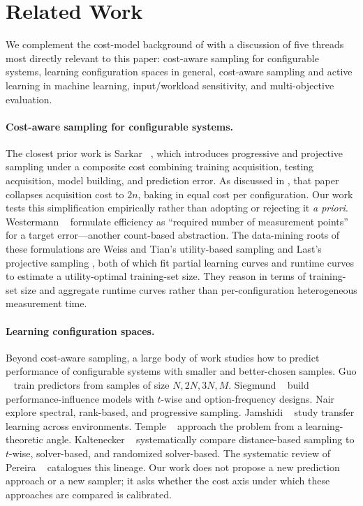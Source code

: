 \section{Related Work}
\label{sec:related_work}

We complement the cost-model background of  with a
discussion of five threads most directly relevant to this paper:
cost-aware sampling for configurable systems, learning configuration spaces
in general, cost-aware sampling and active learning in machine learning,
input/workload sensitivity, and multi-objective evaluation.

\paragraph*{Cost-aware sampling for configurable systems.}
The closest prior work is Sarkar \etal~\cite{sarkar2015}, which introduces
progressive and projective sampling under a composite cost combining training
acquisition, testing acquisition, model building, and prediction error. As
discussed in , that paper collapses acquisition cost
to $2n$, baking in equal cost per configuration. Our work tests this
simplification empirically rather than adopting or rejecting it
\emph{a priori}. Westermann \etal~\cite{westermann2012} formulate efficiency
as ``required number of measurement points'' for a target error---another
count-based abstraction. The data-mining roots of these formulations are
Weiss and Tian's utility-based sampling and Last's projective sampling
, both of which fit partial learning curves and runtime curves
to estimate a utility-optimal training-set size. They reason in terms of
training-set size and aggregate runtime curves rather than per-configuration
heterogeneous measurement time.

\paragraph*{Learning configuration spaces.}
Beyond cost-aware sampling, a large body of work studies how to predict
performance of configurable systems with smaller and better-chosen
samples. Guo \etal~\cite{guo2013ASE,Guo2017} train predictors from samples of
size $N,2N,3N,M$. Siegmund
\etal~\cite{siegmund2012a,siegmund2013,siegmund2015FSE} build
performance-influence models with $t$-wise and option-frequency designs.
Nair \etal~\cite{nair2017,nair2018c,nair2018a} explore spectral, rank-based,
and progressive sampling. Jamshidi \etal~\cite{jamshidi2017b,jamshidi2018}
study transfer learning across environments. Temple
\etal~\cite{temple2017a} approach the problem from a learning-theoretic
angle. Kaltenecker \etal~\cite{kaltenecker2019} systematically compare
distance-based sampling to $t$-wise, solver-based, and randomized
solver-based. The systematic review of Pereira \etal~\cite{julianasurvey}
catalogues this lineage. Our work does not propose a new prediction approach
or a new sampler; it asks whether the cost axis under which these approaches
are compared is calibrated.

